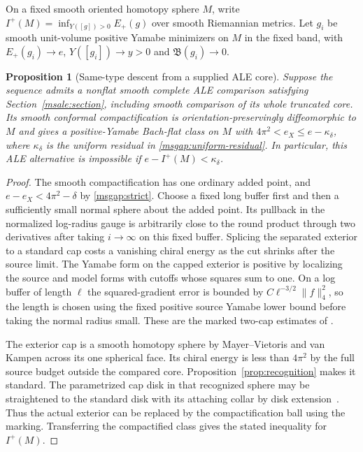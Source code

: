 \documentclass[11pt]{article}
\numberwithin{equation}{section}
\newtheorem{proposition}[theorem]{Proposition}
\theoremstyle{definition}
\theoremstyle{remark}
\begin{document}
On a fixed smooth oriented homotopy sphere \(M\), write
\(I^+(M)=\inf_{Y([g])>0}E_+(g)\) over smooth Riemannian metrics.
Let \(g_i\) be smooth unit-volume positive Yamabe minimizers on \(M\)
in the fixed band, with \(E_+(g_i)\to e\), \(Y([g_i])\to y>0\) and
\(\mathfrak B(g_i)\to0\).

\begin{proposition}[Same-type descent from a supplied ALE core]\label{prop:marked-descent}
Suppose the sequence admits a nonflat smooth complete ALE comparison
satisfying Section~\ref{msale:section}, including smooth comparison
of its whole truncated core. Its smooth conformal compactification
is orientation-preservingly diffeomorphic to \(M\) and gives a
positive-Yamabe Bach-flat class on \(M\) with
\(4\pi^2<e_X\le e-\kappa_\delta\), where \(\kappa_\delta\) is
the uniform residual in \eqref{msgap:uniform-residual}. In particular,
this ALE alternative is impossible if \(e-I^+(M)<\kappa_\delta\).
\end{proposition}

\begin{proof}
The smooth compactification has one ordinary added point, and
\(e-e_X<4\pi^2-\delta\) by \eqref{msgap:strict}.
Choose a fixed long buffer first and then a sufficiently small
normal sphere about the added point. Its pullback in the normalized
log-radius gauge is arbitrarily close to the round product through
two derivatives after taking \(i\to\infty\) on this fixed buffer.
Splicing the separated exterior to a standard cap costs a vanishing
chiral energy as the cut shrinks after the source limit. The Yamabe
form on the capped exterior is positive by localizing the source
and model forms with cutoffs whose squares sum to one. On a log
buffer of length \(\ell\) the squared-gradient error is bounded by
\(C\ell^{-3/2}\|f\|_4^2\), so the length is chosen using the fixed
positive source Yamabe lower bound before taking the normal radius
small. These are the marked two-cap estimates of
\cite{Baker2026MarkedNecks}.

The exterior cap is a smooth homotopy sphere by Mayer--Vietoris and
van Kampen across its one spherical face. Its chiral energy is
less than \(4\pi^2\) by the full source budget outside the compared
core. Proposition~\ref{prop:recognition} makes it standard. The
parametrized cap disk in that recognized sphere may be straightened
to the standard disk with its attaching collar by disk
extension~\cite[Theorem C]{Palais1960Extending}. Thus the actual
exterior can be replaced by the compactification ball using the
marking. Transferring the compactified class gives the stated
inequality for \(I^+(M)\).
\end{proof}
\end{document}
